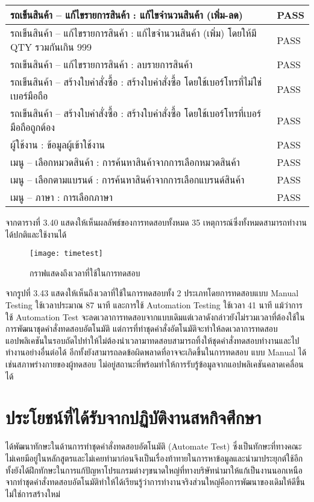\begin{longtable}{|l|l|}
    \hline
    รถเข็นสินค้า – แก้ไขรายการสินค้า : แก้ไขจำนวนสินค้า (เพิ่ม-ลด)                           & PASS             \\ 
    \hline
    รถเข็นสินค้า – แก้ไขรายการสินค้า : แก้ไขจำนวนสินค้า (เพิ่ม) โดยให้มี QTY รวมกันเกิน 999  & PASS             \\ 
    \hline
    รถเข็นสินค้า – แก้ไขรายการสินค้า : ลบรายการสินค้า                                        & PASS             \\ 
    \hline
    รถเข็นสินค้า – สร้างใบคำสั่งซื้อ : สร้างใบคำสั่งซื้อ โดยใช้เบอร์โทรที่ไม่ใช่เบอร์มือถือ  & PASS             \\ 
    \hline
    รถเข็นสินค้า – สร้างใบคำสั่งซื้อ : สร้างใบคำสั่งซื้อ โดยใช้เบอร์โทรที่เบอร์มือถือถูกต้อง & PASS             \\ 
    \hline
    ผู้ใช้งาน : ข้อมูลผู้เข้าใช้งาน                                                          & PASS             \\ 
    \hline
    เมนู – เลือกหมวดสินค้า : การค้นหาสินค้าจากการเลือกหมวดสินค้า                             & PASS             \\ 
    \hline
    เมนู – เลือกตามแบรนด์ : การค้นหาสินค้าจากการเลือกแบรนด์สินค้า                            & PASS             \\ 
    \hline
    เมนู – ภาษา : การเลือกภาษา                                                               & PASS             \\
    \hline
\end{longtable}

จากตารางที่ 3.40 แสดงให้เห็นผลลัพธ์ของการทดสอบทั้งหมด 35 เหตุการณ์ซึ่งทั้งหมดสามารถทำงานได้ปกติและใช้งานได้

\begin{figure}[H]
    \centering
    \texttt{[image: timetest]}
    \caption{กราฟแสดงถึงเวลาที่ใช้ในการทดสอบ}
    \label{Fig:9999990}
\end{figure}

จากรูปที่ 3.43 แสดงให้เห็นถึงเวลาที่ใช้ในการทดสอบทั้ง 2 ประเภทโดยการทดสอบแบบ Manual Testing ใช้เวลาประมาณ 87 นาที และการใช้ Automation Testing ใช้เวลา 41 นาที แม้ว่าการใช้ Automation Test จะลดเวลาการทดสอบจากแบบเดิมแต่เวลาดังกล่าวยังไม่รวมเวลาที่ต้องใช้ในการพัฒนาชุดคำสั่งทดสอบอัตโนมัติ
แต่การที่ทำชุดคำสั่งอัตโนมัติจะทำให้ลดเวลาการทดสอบแอปพลิเคชันในรอบถัดไปทำให้ไม่ต้องนำเวลามาทดสอบสามารถทิ้งให้ชุดคำสั่งทดสอบทำงานและไปทำงานอย่างอื่นต่อได้ อีกทั้งยังสามารถลดข้อผิดพลาดที่อาจจะเกิดขึ้นในการทดสอบ แบบ Manual ได้เช่นสภาพร่างกายของผู้ทดสอบ
ไม่อยู่สถานะที่พร้อมทำให้การรับรู้ข้อมูลจากแอปพลิเคชันคลาดเคลื่อนได้


\section{ประโยชน์ที่ได้รับจากปฏิบัติงานสหกิจศึกษา}
ได้พัฒนาทักษะในด้านการทำชุดคำสั่งทดสอบอัตโนมัติ (Automate Test) ซึ่งเป็นทักษะที่ทางคณะไม่เคยมีอยู่ในหลักสูตรและไม่เคยทำมาก่อนจึงเป็นเรื่องท้าทายในการหาข้อมูลและนำมาประยุกต์ใช้อีกทั้งยังได้ฝึกทักษะในการแก้ปัญหาโปรแกรมต่างๆขนาดใหญ่ที่ทางบริษัทนำมาให้แก้เป็นงานนอกเหนือจากทำชุดคำสั่งทดสอบอัตโนมัติทำให้ได้เรียนรู้ว่าการทำงานจริงส่วนใหญ่คือการพัฒนาของเดิมให้ดีขึ้นไม่ใช่การสร้างใหม่